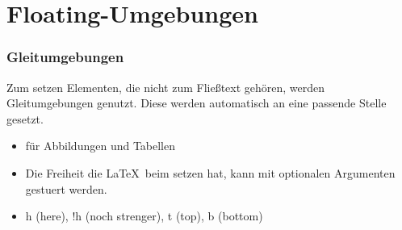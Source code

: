\section{Floating-Umgebungen}
\begin{frame}
    \frametitle{Gleitumgebungen}
    Zum setzen Elementen, die nicht zum Fließtext gehören, werden Gleitumgebungen genutzt. Diese werden automatisch an eine passende Stelle gesetzt.
    \begin{itemize}
        \item für Abbildungen und Tabellen
        \item Die Freiheit die \LaTeX \ beim setzen hat, kann mit optionalen Argumenten gestuert werden. 
        \item h  (here), !h (noch strenger), t (top), b (bottom)
    \end{itemize}
\end{frame}
